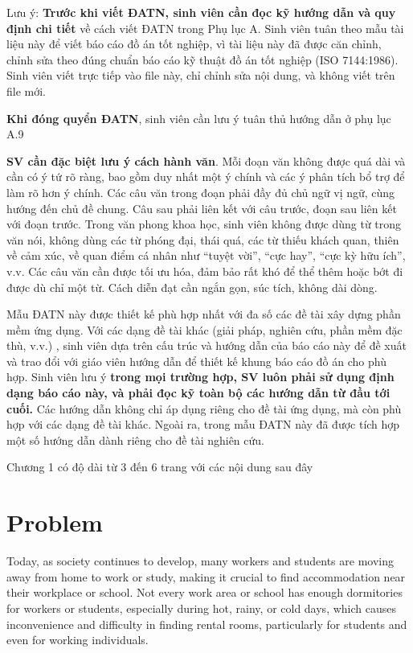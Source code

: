 \documentclass[../Main.tex]{subfiles}
\begin{document}
Lưu ý: \textbf{Trước khi viết ĐATN, sinh viên cần đọc kỹ hướng dẫn và quy định chi tiết} về cách viết ĐATN trong Phụ lục A.
Sinh viên tuân theo mẫu tài liệu này để viết báo cáo đồ án tốt nghiệp, vì tài liệu này đã được căn chỉnh, chỉnh sửa theo đúng chuẩn báo cáo kỹ thuật đồ án tốt nghiệp (ISO 7144:1986).
Sinh viên viết trực tiếp vào file này, chỉ chỉnh sửa nội dung, và không viết trên file mới.

\textbf{Khi đóng quyển ĐATN}, sinh viên cần lưu ý tuân thủ hướng dẫn ở phụ lục A.9

\textbf{SV cần đặc biệt lưu ý cách hành văn}.
Mỗi đoạn văn không được quá dài và cần có ý tứ rõ ràng, bao gồm duy nhất một ý chính và các ý phân tích bổ trợ để làm rõ hơn ý chính.
Các câu văn trong đoạn phải đầy đủ chủ ngữ vị ngữ, cùng hướng đến chủ đề chung.
Câu sau phải liên kết với câu trước, đoạn sau liên kết với đoạn trước.
Trong văn phong khoa học, sinh viên không được dùng từ trong văn nói, không dùng các từ phóng đại, thái quá, các từ thiếu khách quan, thiên về cảm xúc, về quan điểm cá nhân như “tuyệt vời”, “cực hay”, “cực kỳ hữu ích”, v.v.
Các câu văn cần được tối ưu hóa, đảm bảo rất khó để thể thêm hoặc bớt đi được dù chỉ một từ.
Cách diễn đạt cần ngắn gọn, súc tích, không dài dòng.

Mẫu ĐATN này được thiết kế phù hợp nhất với đa số các đề tài xây dựng phần mềm ứng dụng.
Với các dạng đề tài khác (giải pháp, nghiên cứu, phần mềm đặc thù, v.v.)
, sinh viên dựa trên cấu trúc và hướng dẫn của báo cáo này để đề xuất và trao đổi với giáo viên hướng dẫn để thiết kế khung báo cáo đồ án cho phù hợp.
Sinh viên lưu ý \textbf{trong mọi trường hợp, SV luôn phải sử dụng định dạng báo cáo này, và phải đọc kỹ toàn bộ các hướng dẫn từ đầu tới cuối.
}
Các hướng dẫn không chỉ áp dụng riêng cho đề tài ứng dụng, mà còn phù hợp với các dạng đề tài khác.
Ngoài ra, trong mẫu ĐATN này đã được tích hợp một số hướng dẫn dành riêng cho đề tài nghiên cứu.

Chương 1 có độ dài từ 3 đến 6 trang với các nội dung sau đây

\section{Problem}
\label{sec:problem}

Today, as society continues to develop, many workers and students are moving away from home to work or study, making it crucial to find accommodation near their workplace or school.
Not every work area or school has enough dormitories for workers or students, especially during hot, rainy, or cold days, which causes inconvenience and difficulty in finding rental rooms, particularly for students and even for working individuals.
\end{document}
